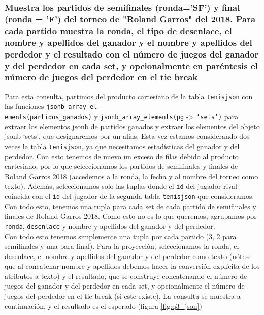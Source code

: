 \subsubsection{Muestra los partidos de semiﬁnales (ronda='SF') y ﬁnal (ronda = 'F') del torneo de "Roland Garros" del 2018. Para cada partido muestra la ronda, el tipo de desenlace, el nombre y apellidos del ganador y el nombre y apellidos del perdedor y el resultado con el número de juegos del ganador y del perdedor en cada set, y opcionalmente en paréntesis el número de juegos del perdedor en el tie break}

Para esta consulta, partimos del producto cartesiano de la tabla \texttt{tenisjson} con las funciones \texttt{jsonb\_array\_el-}\\\texttt{ements(partidos\_ganados)} y \texttt{jsonb\_array\_elements(pg} -> \texttt{`sets')} para extraer los elementos jsonb de partidos ganados y extraer los elementos del objeto jsonb `sets', que designaremos por un alias. Esta vez estamos considerando dos veces la tabla \texttt{tenisjson}, ya que necesitamos estadísticas del ganador y del perdedor. Con esto tenemos de nuevo un exceso de filas debido al producto cartesiano, por lo que seleccionamos los partidos de semifinales y finales de Roland Garros 2018 (accedemos a la ronda, la fecha y al nombre del torneo como texto). Además, seleccionamos solo las tuplas donde el \texttt{id} del jugador rival coincida con el \texttt{id} del jugador de la segunda tabla \texttt{tenisjson} que consideramos. Con todo esto, tenemos una tupla para cada set de cada partido de semifinales y finales de Roland Garros 2018. Como esto no es lo que queremos, agrupamos por \texttt{ronda}, \texttt{desenlace} y nombre y apellidos del ganador y del perdedor. \\

Con todo esto tenemos simplemente una tupla por cada partido (3, 2 para semifinales y una para final). Para la proyección, seleccionamos la ronda, el desenlace, el nombre y apellidos del ganador y del perdedor como texto (nótese que al concatenar nombre y apellidos debemos hacer la conversión explícita de los atributos a texto) y el resultado, que se construye concatenando el número de juegos del ganador y del perdedor en cada set, y opcionalmente el número de juegos del perdedor en el tie break (si este existe). La consulta se muestra a continuación, y el resultado es el esperado (figura \ref{fig:q3_json})

